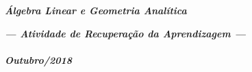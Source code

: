 \documentclass[pdftex, brazil, 12pt, oneside, addpoints]{exam}
\begin{document}
\begin{coverpages}

\begin{center}
\textbf{\textit{\Large%
Álgebra Linear e Geometria Analítica}}
\end{center}

\vspace{1cm}

\begin{figure}[H]
\begin{center}
\end{center}
\end{figure}

\vspace{1cm}

\begin{center}
\textit{\textbf{\Large%
--- Atividade de Recuperação da Aprendizagem ---\\%
\ \\%
Outubro/2018}}
\end{center}



\end{coverpages}
\end{document}
